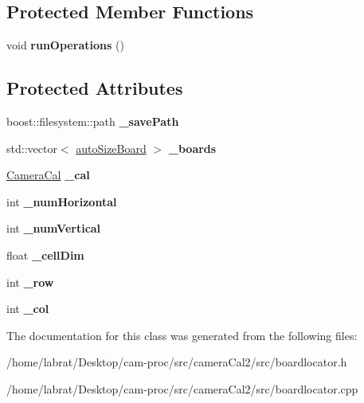\subsection*{Protected Member Functions}
\begin{DoxyCompactItemize}
\item 
void {\bfseries run\+Operations} ()\hypertarget{classBoardLocator_a08ec97bb3b5a5228c8e9090d525c2816}{}\label{classBoardLocator_a08ec97bb3b5a5228c8e9090d525c2816}

\end{DoxyCompactItemize}
\subsection*{Protected Attributes}
\begin{DoxyCompactItemize}
\item 
boost\+::filesystem\+::path {\bfseries \+\_\+save\+Path}\hypertarget{classBoardLocator_a80885202ff22cfc4fee337d29c61047b}{}\label{classBoardLocator_a80885202ff22cfc4fee337d29c61047b}

\item 
std\+::vector$<$ \hyperlink{classautoSizeBoard}{auto\+Size\+Board} $>$ {\bfseries \+\_\+boards}\hypertarget{classBoardLocator_a486f5e1573f84e3c8af5169855e4909c}{}\label{classBoardLocator_a486f5e1573f84e3c8af5169855e4909c}

\item 
\hyperlink{classCameraCal}{Camera\+Cal} {\bfseries \+\_\+cal}\hypertarget{classBoardLocator_a608463a44ef3dd90634277115203bd61}{}\label{classBoardLocator_a608463a44ef3dd90634277115203bd61}

\item 
int {\bfseries \+\_\+num\+Horizontal}\hypertarget{classBoardLocator_a5fe2fc7e06c6774bf195ab0a05282dac}{}\label{classBoardLocator_a5fe2fc7e06c6774bf195ab0a05282dac}

\item 
int {\bfseries \+\_\+num\+Vertical}\hypertarget{classBoardLocator_a80b5c8ff6a8f3b7aea19ef3545fa487c}{}\label{classBoardLocator_a80b5c8ff6a8f3b7aea19ef3545fa487c}

\item 
float {\bfseries \+\_\+cell\+Dim}\hypertarget{classBoardLocator_a79404e4c68c077a5eac599fb7e7c2c90}{}\label{classBoardLocator_a79404e4c68c077a5eac599fb7e7c2c90}

\item 
int {\bfseries \+\_\+row}\hypertarget{classBoardLocator_a4d3182d946b8b3baa1f9662e82a50190}{}\label{classBoardLocator_a4d3182d946b8b3baa1f9662e82a50190}

\item 
int {\bfseries \+\_\+col}\hypertarget{classBoardLocator_aaf12e063957845af1561ca008f92de4e}{}\label{classBoardLocator_aaf12e063957845af1561ca008f92de4e}

\end{DoxyCompactItemize}


The documentation for this class was generated from the following files\+:\begin{DoxyCompactItemize}
\item 
/home/labrat/\+Desktop/cam-\/proc/src/camera\+Cal2/src/boardlocator.\+h\item 
/home/labrat/\+Desktop/cam-\/proc/src/camera\+Cal2/src/boardlocator.\+cpp\end{DoxyCompactItemize}
